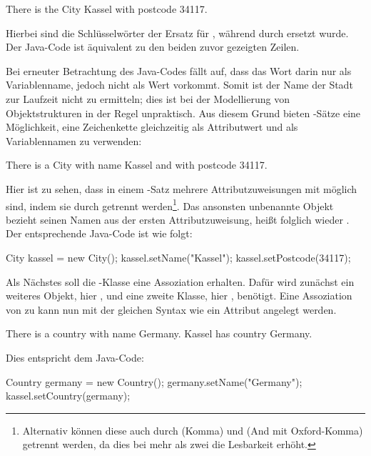 \begin{codeblock}
    There is the City Kassel with postcode 34117.
\end{codeblock}

Hierbei sind die Schlüsselwörter  der Ersatz für , während  durch  ersetzt wurde.
Der Java-Code ist äquivalent zu den beiden zuvor gezeigten Zeilen.

Bei erneuter Betrachtung des Java-Codes fällt auf, dass das Wort  darin nur als Variablenname, jedoch nicht als Wert vorkommt.
Somit ist der Name der Stadt zur Laufzeit nicht zu ermitteln;
dies ist bei der Modellierung von Objektstrukturen in der Regel unpraktisch.
Aus diesem Grund bieten -Sätze eine Möglichkeit, eine Zeichenkette gleichzeitig als Attributwert und als Variablennamen zu verwenden:

\begin{codeblock}
    There is a City with name Kassel and with postcode 34117.
\end{codeblock}

Hier ist zu sehen, dass in einem -Satz mehrere Attributzuweisungen mit  möglich sind, indem sie durch  getrennt werden\footnote{
Alternativ können diese auch durch \code{,} (Komma) und  (And mit Oxford-Komma) getrennt werden, da dies bei mehr als zwei  die Lesbarkeit erhöht.
}.
Das ansonsten unbenannte Objekt bezieht seinen Namen aus der ersten Attributzuweisung, heißt folglich wieder .
Der entsprechende Java-Code ist wie folgt:

\begin{jcodeblock}
    City kassel = new City();
    kassel.setName("Kassel");
    kassel.setPostcode(34117);
\end{jcodeblock}

Als Nächstes soll die -Klasse eine Assoziation erhalten.
Dafür wird zunächst ein weiteres Objekt, hier , und eine zweite Klasse, hier , benötigt.
Eine Assoziation von  zu  kann nun mit der gleichen Syntax wie ein Attribut angelegt werden.

\begin{codeblock}
    There is a country with name Germany.
    Kassel has country Germany.
\end{codeblock}

Dies entspricht dem Java-Code:

\begin{jcodeblock}
    Country germany = new Country();
    germany.setName("Germany");
    kassel.setCountry(germany);
\end{jcodeblock}

